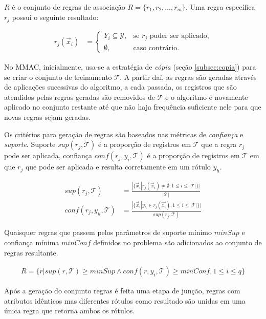 \documentclass[runningheads,a4paper]{llncs}
\begin{document}
$R$ é o conjunto de regras de associação $R = \{ r_1, r_2, \dots, r_m \}$. Uma regra específica $r_j$ possui o seguinte resultado:

\begin{align*}
	r_j(\vec{x}_i) &= \begin{cases}
						 Y_i \subseteq \mathcal{Y}, & \text{se $r_j$ puder ser aplicado,} \\
			             \emptyset, & \text{caso contrário.}
		            \end{cases}
\end{align*}

No MMAC, inicialmente, usa-se a estratégia de \textit{cópia} (seção \ref{subsec:copia}) para se criar o conjunto de treinamento $\mathcal{T}$. A partir daí, as regras são geradas através de aplicações sucessivas do algoritmo, a cada passada, os registros que são atendidos pelas regras geradas são removidos de $\mathcal{T}$ e o algoritmo é novamente aplicado no conjunto restante até que não haja frequência suficiente nele para que novas regras sejam geradas.

Os critérios para geração de regras são baseados nas métricas de \textit{confiança} e \textit{suporte}. Suporte $sup(r_j, \mathcal{T})$ é a proporção de registros em $\mathcal{T}$ que a regra $r_j$ pode ser aplicada, confiança $conf(r_j, y_i, \mathcal{T})$ é a proporção de registros em $\mathcal{T}$ em que $r_j$ que pode ser aplicada e resulta corretamente em um rótulo $y_h$.

\begin{align*}
	sup(r_j, \mathcal{T}) &= \frac{|\{ \vec{x}_i | r_j(\vec{x}_i) \neq \emptyset, 1 \leq i \leq |\mathcal{T}| \}|}{|\mathcal{T}|} \\
	conf(r_j, y_h, \mathcal{T}) &= \frac{|\{ \vec{x}_i | y_h \in r_j(\vec{x_i}), 1 \leq i \leq |\mathcal{T}| \}|}{sup(r_j, \mathcal{T})} 
\end{align*}

Quaisquer regras que passem pelos parâmetros de suporte mínimo $minSup$ e confiança mínima $minConf$ definidos no problema são adicionados ao conjunto de regras resultante.

\begin{align*}
	R = \{ r | sup(r, \mathcal{T}) \geq minSup \wedge conf(r, y_i, \mathcal{T}) \geq minConf, 1 \leq i \leq q \}
\end{align*}

Após a geração do conjunto regras é feita uma etapa de junção, regras com atributos idênticos mas diferentes rótulos como resultado são unidas em uma única regra que retorna ambos os rótulos.
\end{document}
